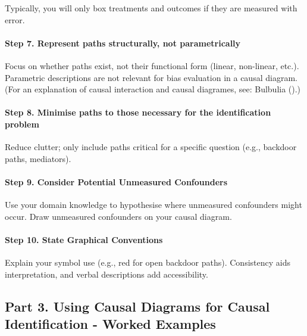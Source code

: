 \documentclass[
  singlecolumn]{article}
\let\oldparagraph\paragraph
\renewcommand{\paragraph}[1]{\oldparagraph{#1}\mbox{}}
\begin{document}
Typically, you will only box treatments and outcomes if they are
measured with error.

\paragraph{Step 7. Represent paths structurally, not
parametrically}\label{step-7.-represent-paths-structurally-not-parametrically}

Focus on whether paths exist, not their functional form (linear,
non-linear, etc.). Parametric descriptions are not relevant for bias
evaluation in a causal diagram. (For an explanation of causal
interaction and causal diagrames, see: Bulbulia
().)

\paragraph{Step 8. Minimise paths to those necessary for the
identification
problem}\label{step-8.-minimise-paths-to-those-necessary-for-the-identification-problem}

Reduce clutter; only include paths critical for a specific question
(e.g., backdoor paths, mediators).

\paragraph{Step 9. Consider Potential Unmeasured
Confounders}\label{step-9.-consider-potential-unmeasured-confounders}

Use your domain knowledge to hypothesise where unmeasured confounders
might occur. Draw unmeasured confounders on your causal diagram.

\paragraph{\texorpdfstring{\textbf{Step 10. State Graphical
Conventions}}{Step 10. State Graphical Conventions}}\label{step-10.-state-graphical-conventions}

Explain your symbol use (e.g., red for open backdoor paths). Consistency
aids interpretation, and verbal descriptions add accessibility.

\subsection{Part 3. Using Causal Diagrams for Causal Identification -
Worked Examples}\label{section-part3}
\end{document}
